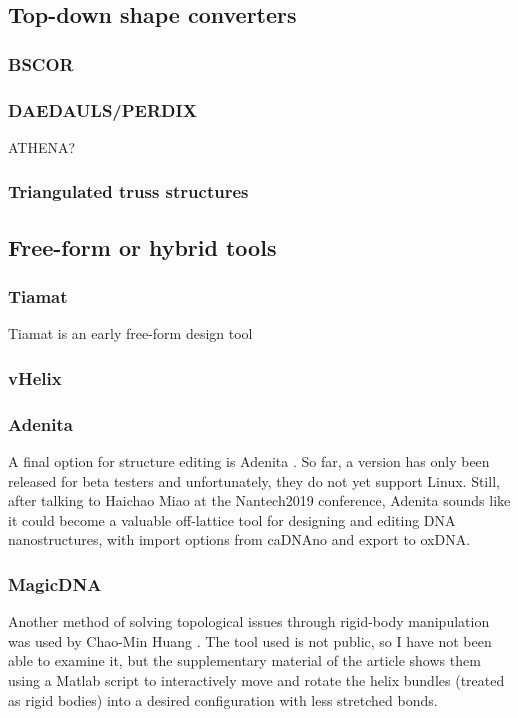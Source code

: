 \subsection{Top-down shape converters}

\subsubsection{BSCOR}\label{sec:bscor}
\subsubsection{DAEDAULS/PERDIX}
ATHENA? %
\subsubsection{Triangulated truss structures}

\subsection{Free-form or hybrid tools}

\subsubsection{Tiamat}
Tiamat is an early free-form design tool

\subsubsection{vHelix}

\subsubsection{Adenita}
A final option for structure editing is Adenita \cite{miao_tvcg_2018}. So far, a version has only been released for beta testers and unfortunately, they do not yet support Linux. Still, after talking to Haichao Miao at the Nantech2019 conference, Adenita sounds like it could become a valuable off-lattice tool for designing and editing DNA nanostructures, with import options from caDNAno and export to oxDNA.

\subsubsection{MagicDNA}
Another method of solving topological issues through rigid-body manipulation was used by Chao-Min Huang \cite{huang2019uncertainty}. The tool used is not public, so I have not been able to examine it, but the supplementary material of the article shows them using a Matlab script to interactively move and rotate the helix bundles (treated as rigid bodies) into a desired configuration with less stretched bonds.

